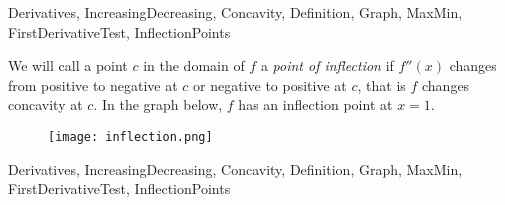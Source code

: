 \begin{tagblock}{Derivatives, IncreasingDecreasing, Concavity, Definition, Graph, MaxMin, FirstDerivativeTest, InflectionPoints}
\begin{question}
We will call a point $c$ in the domain of $f$ a \emph{point of inflection} if $f''(x)$ changes from positive to negative at $c$ or negative to positive at $c$, that is $f$ changes concavity at $c$.  In the graph below, $f$ has an inflection point at $x=1$.  
\begin{figure}[h]
\centering
\texttt{[image: inflection.png]}
\end{figure}





	
\begin{tags}
	   Derivatives, IncreasingDecreasing, Concavity, Definition, Graph, MaxMin, FirstDerivativeTest, InflectionPoints
\end{tags}
	
\begin{diary}
\end{diary}
	
\begin{solution}
	   
\end{solution}
	
\end{question}

\end{tagblock}


